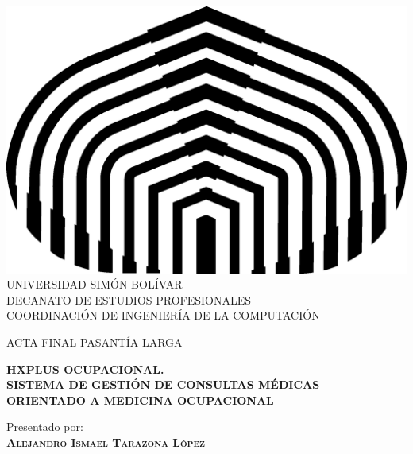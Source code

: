 \begin{titlepage}
    \begin{center}
        
        \includegraphics[scale=0.5]{figures/logo} \\
        
        \textsc {\large UNIVERSIDAD SIM\'ON BOL\'IVAR} \\
        \textsc{DECANATO DE ESTUDIOS PROFESIONALES\\
            COORDINACI\'ON DE INGENIER\'IA DE LA COMPUTACI\'ON}
        
        \bigskip
        \bigskip
        \bigskip
        \bigskip
        \bigskip
        \bigskip
        
        \textsc{ACTA FINAL PASANTÍA LARGA}
        
        \bigskip
        \bigskip
        
        \textsc{\bfseries HXPLUS OCUPACIONAL.\\
            SISTEMA DE GESTIÓN DE CONSULTAS MÉDICAS\\
            ORIENTADO A MEDICINA OCUPACIONAL}
        
        \bigskip
        \bigskip
        \bigskip
        \bigskip
        
        \begin{minipage}{\textwidth}
            \centering
            Presentado por: \\
            \textsc{\bfseries Alejandro Ismael Tarazona López} \\
            

\end{minipage}
\end{center}
\end{titlepage}

